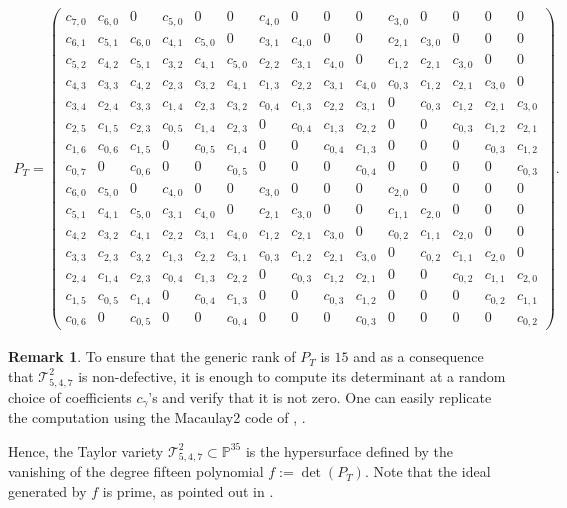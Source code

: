 \documentclass[letterpaper,11pt]{amsart}
\theoremstyle{plain}
\theoremstyle{definition}
\newtheorem{remark}[theorem]{Remark}
\newcommand{\enm}[1]{\ensuremath{#1}}          %
\newcommand{\tv}{\mathcal{T}}
\newcommand{\PP}{\enm{\mathbb{P}}}
\begin{document}
\begin{align*}
P_T=\left(\!\begin{array}{ccccccccccccccc}
     c_{7,0}&c_{6,0}&0&c_{5,0}&0&0&c_{4,0}&0&0&0&c_{3,0}&0&0&0&0\\
     c_{6,1}&c_{5,1}&c_{6,0}&c_{4,1}&c_{5,0}&0&c_{3,1}&c_{4,0}&0&0&c_{2,1}&c_{3,0}&0&0&0\\
     c_{5,2}&c_{4,2}&c_{5,1}&c_{3,2}&c_{4,1}&c_{5,0}&c_{2,2}&c_{3,1}&c_{4,0}&0&c_{1,2}&c_{2,1}&c_{3,0}&0&0\\
     c_{4,3}&c_{3,3}&c_{4,2}&c_{2,3}&c_{3,2}&c_{4,1}&c_{1,3}&c_{2,2}&c_{3,1}&c_{4,0}&c_{0,3}&c_{1,2}&c_{2,1}&c_{3,0}&0\\
     c_{3,4}&c_{2,4}&c_{3,3}&c_{1,4}&c_{2,3}&c_{3,2}&c_{0,4}&c_{1,3}&c_{2,2}&c_{3,1}&0&c_{0,3}&c_{1,2}&c_{2,1}&c_{3,0}\\
     c_{2,5}&c_{1,5}&c_{2,3}&c_{0,5}&c_{1,4}&c_{2,3}&0&c_{0,4}&c_{1,3}&c_{2,2}&0&0&c_{0,3}&c_{1,2}&c_{2,1}\\
     c_{1,6}&c_{0,6}&c_{1,5}&0&c_{0,5}&c_{1,4}&0&0&c_{0,4}&c_{1,3}&0&0&0&c_{0,3}&c_{1,2}\\
     c_{0,7}&0&c_{0,6}&0&0&c_{0,5}&0&0&0&c_{0,4}&0&0&0&0&c_{0,3}\\
     c_{6,0}&c_{5,0}&0&c_{4,0}&0&0&c_{3,0}&0&0&0&c_{2,0}&0&0&0&0\\
     c_{5,1}&c_{4,1}&c_{5,0}&c_{3,1}&c_{4,0}&0&c_{2,1}&c_{3,0}&0&0&c_{1,1}&c_{2,0}&0&0&0\\
     c_{4,2}&c_{3,2}&c_{4,1}&c_{2,2}&c_{3,1}&c_{4,0}&c_{1,2}&c_{2,1}&c_{3,0}&0&c_{0,2}&c_{1,1}&c_{2,0}&0&0\\
     c_{3,3}&c_{2,3}&c_{3,2}&c_{1,3}&c_{2,2}&c_{3,1}&c_{0,3}&c_{1,2}&c_{2,1}&c_{3,0}&0&c_{0,2}&c_{1,1}&c_{2,0}&0\\
     c_{2,4}&c_{1,4}&c_{2,3}&c_{0,4}&c_{1,3}&c_{2,2}&0&c_{0,3}&c_{1,2}&c_{2,1}&0&0&c_{0,2}&c_{1,1}&c_{2,0}\\
     c_{1,5}&c_{0,5}&c_{1,4}&0&c_{0,4}&c_{1,3}&0&0&c_{0,3}&c_{1,2}&0&0&0&c_{0,2}&c_{1,1}\\
     c_{0,6}&0&c_{0,5}&0&0&c_{0,4}&0&0&0&c_{0,3}&0&0&0&0&c_{0,2}
     \end{array}\!\right).  
\end{align*}

\begin{remark}\label{remark: the pade of the example is nonsingular}
To ensure that the generic rank of $P_T$ is $15$ and as a consequence that $\tv^2_{5,4,7}$ is non-defective, it is enough to compute its determinant at a random choice of coefficients $c_\gamma$'s and verify that it is not zero. One can easily replicate the computation using the Macaulay2 code of , \cite{M2}.

Hence, the Taylor variety $\tv^2_{5,4,7}\subset \PP^{35}$ is the hypersurface defined by the vanishing of the degree fifteen polynomial $f:=\det(P_T)$. Note that the ideal generated by $f$ is prime, as pointed out in  .
\end{remark}
\end{document}
